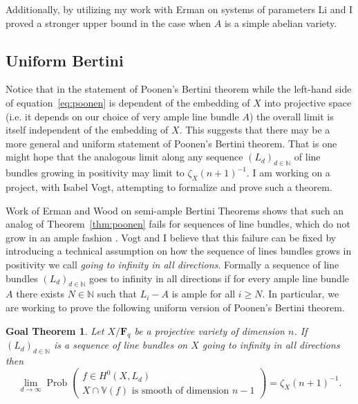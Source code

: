 \documentclass[10pt,reqno]{amsart}
\newtheorem{goalTheorem}[lemma]{Goal Theorem}
\theoremstyle{remark}
\newcommand{\Prob}{\operatorname{Prob}}
\newcommand{\fF}{\mathbf F}
\newcommand{\N}{\mathbb{N}}
\newcommand{\V}{\mathbb{V}}
\begin{document}
Additionally, by utilizing my work with Erman on systems of parameters Li and I proved a stronger upper bound in the case when $A$ is a simple abelian variety. 

\subsection{Uniform Bertini}

Notice that in the statement of Poonen's Bertini theorem while the left-hand side of equation~\eqref{eq:poonen} is dependent of the embedding of $X$ into projective space (i.e. it depends on our choice of very ample line bundle $A$) the overall limit is itself independent of the embedding of $X$. This suggests that there may be a more general and uniform statement of Poonen's Bertini theorem. That is one might hope that the analogous limit along any sequence $(L_{d})_{d\in\N}$ of line bundles growing in positivity may limit to $\zeta_{X}(n+1)^{-1}$. I am working on a project, with Isabel Vogt, attempting to formalize and prove such a theorem.

Work of Erman and Wood on semi-ample Bertini Theorems shows that such an analog of Theorem~\ref{thm:poonen} fails for sequences of line bundles, which do not grow in an ample fashion \cite{ermanWood15}. Vogt and I believe that this failure can be fixed by introducing a technical assumption on how the sequence of lines bundles grows in positivity we call \textit{going to infinity in all directions}. Formally a sequence of line bundles  $\left(L_{d}\right)_{d\in\N}$ goes to infinity in all directions if for every ample line bundle $A$ there exists $N\in \N$ such that $L_{i}-A$ is ample for all $i\geq N$. In particular, we are working to prove the following uniform version of Poonen's Bertini theorem.
 
\begin{goalTheorem}\label{gthm:effective-bertini}
Let $X/\fF_{q}$ be a projective variety of dimension $n$. If $\left(L_{d}\right)_{d\in\N}$ is a sequence of line bundles on $X$ going to infinity in all directions then 
\begin{equation}
\lim_{d\to \infty} \Prob\left(\begin{matrix} f\in H^0\left(X, L_{d}\right) \\ \text{$X\cap \V(f)$ is smooth of dimension $n-1$}\end{matrix}\right)=
\zeta_X(n+1)^{-1}.
\end{equation}
\end{goalTheorem}
\end{document}
